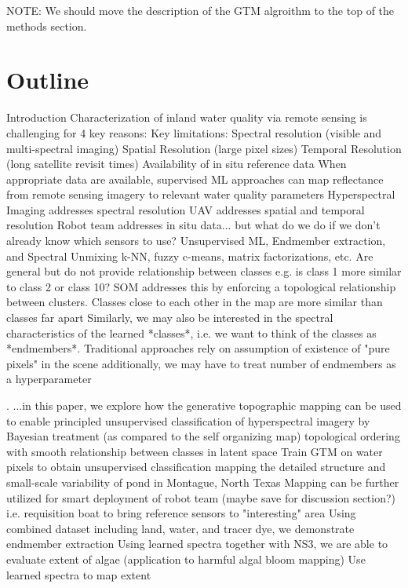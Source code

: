 \documentclass{article}
\begin{document}
NOTE: We should move the description of the GTM algroithm to the top of the methods section.

\section*{Outline}
\begin{outline}[enumerate]
\1 Introduction
    \2 Characterization of inland water quality via remote sensing is challenging for 4 key reasons:
        \3 Key limitations:
            \4 Spectral resolution (visible and multi-spectral imaging)
            \4 Spatial Resolution (large pixel sizes)
            \4 Temporal Resolution (long satellite revisit times)
            \4 Availability of in situ reference data
        \3 When appropriate data are available, supervised ML approaches can map reflectance from remote sensing imagery to relevant water quality parameters
    \2 Hyperspectral Imaging addresses spectral resolution
    \2 UAV addresses spatial and temporal resolution
    \2 Robot team addresses in situ data... but what do we do if we don't already know which sensors to use? 
    \2 Unsupervised ML, Endmember extraction, and Spectral Unmixing
        \3 k-NN, fuzzy c-means, matrix factorizations, etc.
            \4 Are general but do not provide relationship between classes e.g. is class 1 more similar to class 2 or class 10?
        \3 SOM addresses this by enforcing a topological relationship between clusters. Classes close to each other in the map are more similar than classes far apart
        \3 Similarly, we may also be interested in the spectral characteristics of the learned *classes*, i.e. we want to think of the classes as *endmembers*.
            \4 Traditional approaches rely on assumption of existence of "pure pixels" in the scene
            \4 additionally, we may have to treat number of endmembers as a hyperparameter

    \2. ...in this paper, we explore how the generative topographic mapping can be used to
        \3 enable principled unsupervised classification of hyperspectral imagery by
            \4 Bayesian treatment (as compared to the self organizing map)
            \4 topological ordering with smooth relationship between classes in latent space
        \3 Train GTM on water pixels to obtain unsupervised classification mapping the detailed structure and small-scale variability of pond in Montague, North Texas
        \3 Mapping can be further utilized for smart deployment of robot team (maybe save for discussion section?) i.e. requisition boat to bring reference sensors to "interesting" area
        \3 Using combined dataset including land, water, and tracer dye, we demonstrate endmember extraction
        \3 Using learned spectra together with NS3, we are able to evaluate extent of algae (application to harmful algal bloom mapping)
        \3 Use learned spectra to map extent



\end{outline}
\end{document}
